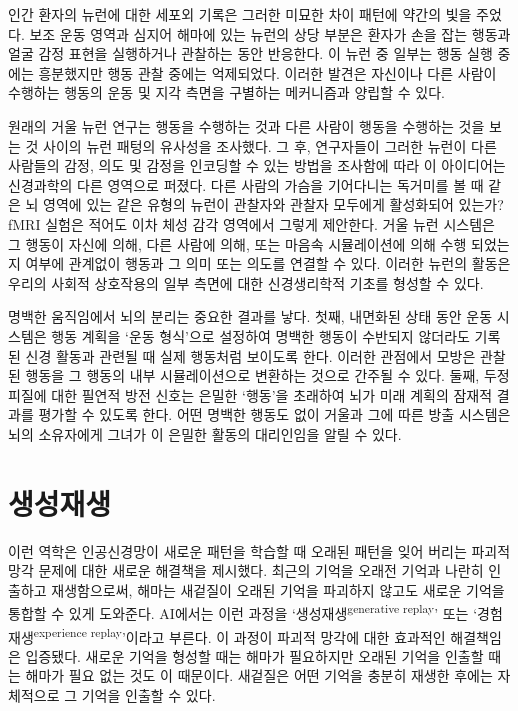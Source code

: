 \documentclass[openany]{book}
\begin{document}
\begin{appendices}
인간 환자의 뉴런에 대한 세포외 기록은 그러한 미묘한 차이 패턴에 약간의 빛을 주었다. 보조 운동 영역과 심지어 해마에 있는 뉴런의 상당 부분은 환자가 손을 잡는 행동과 얼굴 감정 표현을 실행하거나 관찰하는 동안 반응한다. 이 뉴런 중 일부는 행동 실행 중에는 흥분했지만 행동 관찰 중에는 억제되었다. 이러한 발견은 자신이나 다른 사람이 수행하는 행동의 운동 및 지각 측면을 구별하는 메커니즘과 양립할 수 있다.

원래의 거울 뉴런 연구는 행동을 수행하는 것과 다른 사람이 행동을 수행하는 것을 보는 것 사이의 뉴런 패텅의 유사성을 조사했다. 그 후, 연구자들이 그러한 뉴런이 다른 사람들의 감정, 의도 및 감정을 인코딩할 수 있는 방법을 조사함에 따라 이 아이디어는 신경과학의 다른 영역으로 퍼졌다. 다른 사람의 가슴을 기어다니는 독거미를 볼 때 같은 뇌 영역에 있는 같은 유형의 뉴런이 관찰자와 관찰자 모두에게 활성화되어 있는가? fMRI 실험은 적어도 이차 체성 감각 영역에서 그렇게 제안한다. 거울 뉴런 시스템은 그 행동이 자신에 의해, 다른 사람에 의해, 또는 마음속 시뮬레이션에 의해 수행 되었는지 여부에 관계없이 행동과 그 의미 또는 의도를 연결할 수 있다. 이러한 뉴런의 활동은 우리의 사회적 상호작용의 일부 측면에 대한 신경생리학적 기초를 형성할 수 있다.

명백한 움직임에서 뇌의 분리는 중요한 결과를 낳다. 첫째, 내면화된 상태 동안 운동 시스템은 행동 계획을 `운동 형식’으로 설정하여 명백한 행동이 수반되지 않더라도 기록된 신경 활동과 관련될 때 실제 행동처럼 보이도록 한다. 이러한 관점에서 모방은 관찰된 행동을 그 행동의 내부 시뮬레이션으로 변환하는 것으로 간주될 수 있다. 둘째, 두정피질에 대한 필연적 방전 신호는 은밀한 `행동’을 초래하여 뇌가 미래 계획의 잠재적 결과를 평가할 수 있도록 한다. 어떤 명백한 행동도 없이 거울과 그에 따른 방출 시스템은 뇌의 소유자에게 그녀가 이 은밀한 활동의 대리인임을 알릴 수 있다.

\chapter{생성재생}
이런 역학은 인공신경망이 새로운 패턴을 학습할 때 오래된 패턴을 잊어 버리는 파괴적 망각 문제에 대한 새로운 해결책을 제시했다. 최근의 기억을 오래전 기억과 나란히 인출하고 재생함으로써, 해마는 새겉질이 오래된 기억을 파괴하지 않고도 새로운 기억을 통합할 수 있게 도와준다. AI에서는 이런 과정을 `생성재생\textsuperscript{generative replay}' 또는 `경험재생\textsuperscript{experience replay}'이라고 부른다.
이 과정이 파괴적 망각에 대한 효과적인 해결책임은 입증됐다. 새로운 기억을 형성할 때는 해마가 필요하지만 오래된 기억을 인출할 때는 해마가 필요 없는 것도 이 때문이다. 새겉질은 어떤 기억을 충분히 재생한 후에는 자체적으로 그 기억을 인출할 수 있다.


\end{appendices}
\end{document}
